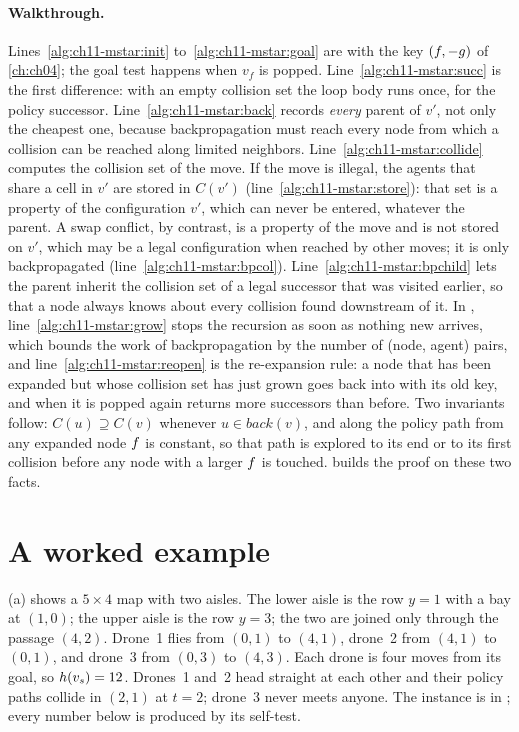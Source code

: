 \paragraph{Walkthrough.} Lines~\ref{alg:ch11-mstar:init}
to~\ref{alg:ch11-mstar:goal} are \astar with the key $(f, -g)$ of
\cref{ch:ch04}; the goal test happens when $v_f$ is popped.
Line~\ref{alg:ch11-mstar:succ} is the first difference: with an empty
collision set the loop body runs once, for the policy successor.
Line~\ref{alg:ch11-mstar:back} records \emph{every} parent of $v'$, not only
the cheapest one, because backpropagation must reach every node from which
a collision can be reached along limited neighbors.
Line~\ref{alg:ch11-mstar:collide} computes the collision set of the move. If
the move is illegal, the agents that share a cell in $v'$ are stored in
$C(v')$ (line~\ref{alg:ch11-mstar:store}): that set is a property of the
configuration $v'$, which can never be entered, whatever the parent. A swap
conflict, by contrast, is a property of the move and is not stored on $v'$,
which may be a legal configuration when reached by other moves; it is only
backpropagated (line~\ref{alg:ch11-mstar:bpcol}).
Line~\ref{alg:ch11-mstar:bpchild} lets the parent inherit the collision set
of a legal successor that was visited earlier, so that a node always knows
about every collision found downstream of it. In \MstarBackprop,
line~\ref{alg:ch11-mstar:grow} stops the recursion as soon as nothing new
arrives, which bounds the work of backpropagation by the number of (node,
agent) pairs, and line~\ref{alg:ch11-mstar:reopen} is the re-expansion
rule: a node that has been expanded but whose collision set has just grown
goes back into \Open with its old key, and when it is popped again
\MstarNeighbors returns more successors than before. Two invariants
follow: $C(u) \supseteq C(v)$ whenever $u \in \mathit{back}(v)$, and along
the policy path from any expanded node $f$ is constant, so that path is
explored to its end or to its first collision before any node with a larger
$f$ is touched.  builds the proof on these
two facts.

\section{A worked example}
\label{sec:ch11-example}

\begin{example}
\label{ex:ch11-aisles}
(a) shows a $5 \times 4$ map with two aisles. The
lower aisle is the row $y = 1$ with a bay at $(1, 0)$; the upper aisle is
the row $y = 3$; the two are joined only through the passage $(4, 2)$.
Drone~1 flies from $(0, 1)$ to $(4, 1)$, drone~2 from $(4, 1)$ to $(0, 1)$,
and drone~3 from $(0, 3)$ to $(4, 3)$. Each drone is four moves from its
goal, so $h(v_s) = 12$. Drones~1 and~2 head straight at each other and
their policy paths collide in $(2, 1)$ at $t = 2$; drone~3 never meets
anyone. The instance is  in ;
every number below is produced by its self-test.
\end{example}

